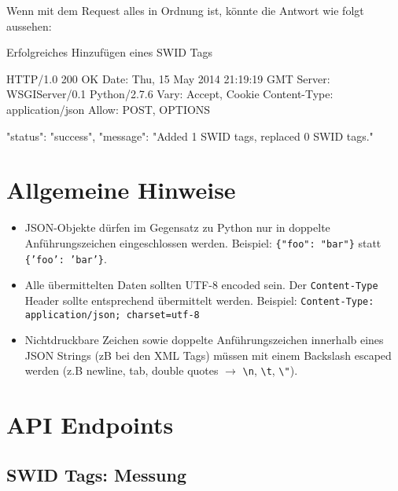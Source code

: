\documentclass[10pt,a4paper]{scrartcl}
\newcommand*{\escape}[1]{\texttt{\textbackslash#1}}
\begin{document}
Wenn mit dem Request alles in Ordnung ist, könnte die Antwort wie folgt aussehen:

\begin{listing}
\caption{Erfolgreiches Hinzufügen eines SWID Tags}
\begin{httpcode}
HTTP/1.0 200 OK
Date: Thu, 15 May 2014 21:19:19 GMT
Server: WSGIServer/0.1 Python/2.7.6
Vary: Accept, Cookie
Content-Type: application/json
Allow: POST, OPTIONS

{
	"status": "success",
	"message": "Added 1 SWID tags, replaced 0 SWID tags."
}
\end{httpcode}
\end{listing}


\newpage
\section{Allgemeine Hinweise}

\begin{itemize}
	\item JSON-Objekte dürfen im Gegensatz zu Python nur in doppelte
		Anführungszeichen eingeschlossen werden. Beispiel: \texttt{\{"foo": "bar"\}}
		statt \texttt{\{'foo': 'bar'\}}.
	\item Alle übermittelten Daten sollten UTF-8 encoded sein. Der
		\texttt{Content-Type} Header sollte entsprechend übermittelt werden.
		Beispiel: \texttt{Content-Type: application/json; charset=utf-8}
	\item Nichtdruckbare Zeichen sowie doppelte Anführungszeichen innerhalb eines
		JSON Strings (zB bei den XML Tags) müssen mit einem Backslash escaped werden
		(z.B newline, tab, double quotes $\rightarrow$ \escape{n}, \escape{t}, \escape{"}).
\end{itemize}


\pagebreak
\section{API Endpoints}

\subsection{SWID Tags: Messung}
\label{api:measurement}
\end{document}
